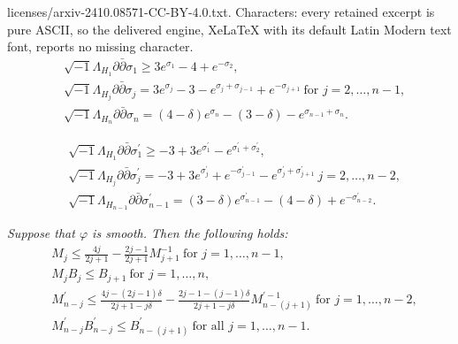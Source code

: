 \documentclass[10pt,a4paper]{amsart}
\def\inum{{\sqrt{-1}}}
\begin{document}
licenses/arxiv-2410.08571-CC-BY-4.0.txt. Characters: every retained excerpt is pure ASCII, so the delivered engine, XeLaTeX with its default Latin Modern text font, reports no missing character.
\begin{align}
&\inum\Lambda_{H_1}\partial \bar{\partial} \sigma_1\geq 3e^{\sigma_1}-4+e^{-\sigma_2}, \label{Hsigma}\\
&\inum \Lambda_{H_j}\partial\bar{\partial}\sigma_j =3e^{\sigma_j}-3-e^{\sigma_j+\sigma_{j-1}}+e^{-\sigma_{j+1}}\ \text{for $j=2,\dots, n-1$}, \label{Hsigma2} \\
&\inum \Lambda_{H_n}\partial\bar{\partial} \sigma_n=(4-\delta)e^{\sigma_n}-(3-\delta)-e^{\sigma_{n-1}+\sigma_n}. \label{Hsigma3}
\end{align}

\begin{align}
&\inum \Lambda_{H_1}\partial \bar{\partial} \sigma^\prime_1\geq -3+3e^{\sigma_1^\prime}-e^{\sigma_1^\prime+\sigma_2^\prime}, \label{Hs}\\
&\inum \Lambda_{H_j}\partial \bar{\partial} \sigma^\prime_j=-3+3e^{\sigma_j^\prime}+e^{-\sigma_{j-1}^\prime}-e^{\sigma_j^\prime+\sigma_{j+1}^\prime}\ \text{$j=2,\dots, n-2$}, \label{Hsigma4}\\
&\inum \Lambda_{H_{n-1}}\partial \bar{\partial} \sigma^\prime_{n-1}=(3-\delta)e^{\sigma_{n-1}^\prime}-(4-\delta)+e^{-\sigma_{n-2}^\prime}. \label{Hsigma5}
\end{align}

\begin{lemm}\label{MMBB}{\it 
Suppose that $\varphi$ is smooth. Then the following holds:
\begin{align}
&M_j \leq \frac{4j}{2j+1}-\frac{2j-1}{2j+1}M_{j+1}^{-1}\ \text{for $j=1,\dots, n-1$}, \label{M}\\
&M_j B_j\leq B_{j+1}\ \text{for $j=1,\dots, n$}, \label{MB}\\
&M_{n-j}^\prime \leq \frac{4j-(2j-1)\delta}{2j+1-j\delta}-\frac{2j-1-(j-1)\delta}{2j+1-j\delta}M_{n-(j+1)}^{\prime-1} \ \text{for $j=1,\dots, n-2$}, \label{Mp}\\
&M_{n-j}^\prime B_{n-j}^\prime \leq B_{n-(j+1)}^\prime\ \text{for all $j=1,\dots, n-1$}. \label{MpBp}
\end{align}
}
\end{lemm}
\end{document}
